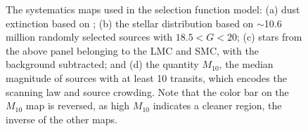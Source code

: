 \begin{figure}
    \centering

    \hspace{5ex}
    
    \hspace{5ex}    

    \caption{The systematics maps used in the selection function model: (a) dust extinction based on \cite{schlafly_measuring_2011}; (b) the stellar distribution based on $\sim$10.6 million randomly selected \Gaia sources with $18.5 < G < 20$; (c) stars from the above panel belonging to the LMC and SMC, with the background subtracted; and (d) the quantity $M_{10}$, the median magnitude of sources with at least 10 \Gaia transits, which encodes the scanning law and source crowding. Note that the color bar on the $M_{10}$ map is reversed, as high $M_{10}$ indicates a cleaner region, the inverse of the other maps.}
    \label{fig:systematics}
\end{figure}

